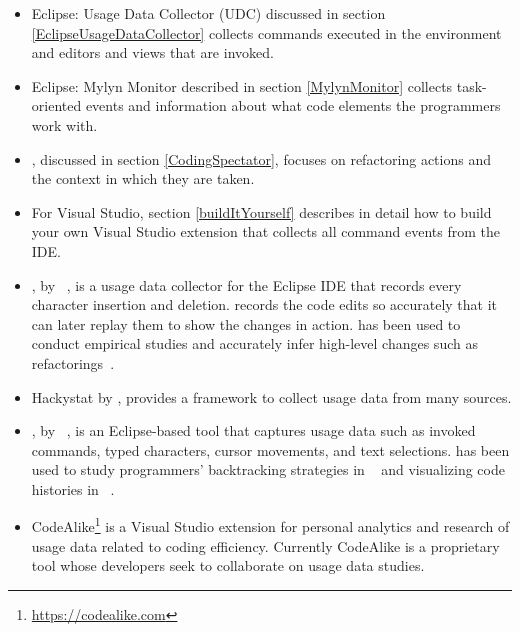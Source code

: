 \begin{itemize}

	\item Eclipse: Usage Data Collector (UDC) discussed in section \ref{EclipseUsageDataCollector} collects commands executed in the environment and editors and views that are invoked.
	
	\item Eclipse: Mylyn Monitor described in section \ref{MylynMonitor} collects task-oriented events and information about what code elements the programmers work with.
	
        \item \CodingSpectator %
, discussed in section \ref{CodingSpectator}, focuses on refactoring actions and the context in which they are taken.


	\item For Visual Studio, section \ref{buildItYourself} describes in detail how to build your own Visual Studio extension that collects all command events from the IDE.

        \item \CodingTracker, by ~, is a usage data collector for the Eclipse IDE that records every character insertion and deletion. \CodingTracker{} records the code edits so accurately that it can later replay them to show the changes in action. \CodingTracker{} has been used to conduct empirical studies and accurately infer high-level changes such as refactorings~\cite{NegaraETAL2013ManualRefactorings}.
	
	\item Hackystat by , provides a framework to collect usage data from many sources.%

        \item \Fluorite, by ~, is an Eclipse-based tool that captures usage data such as invoked commands, typed characters, cursor movements, and text selections. \Fluorite{} has been used to study programmers' backtracking strategies in ~\cite{YoonMyers2012Backtracking} and visualizing code histories in ~\cite{YoonETAL2013VisualizeChange}.
	
	\item CodeAlike\footnote{\url{https://codealike.com}} is a Visual Studio extension for personal analytics and research of usage data related to coding efficiency.  Currently CodeAlike is a proprietary tool whose developers seek to collaborate on usage data studies.

\end{itemize}

